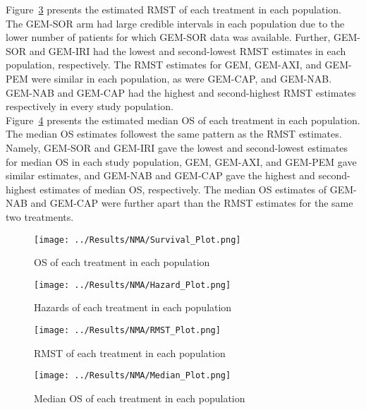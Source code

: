 Figure~\ref{fig:pred_rmstbc} presents the estimated RMST of each treatment in each population. The GEM-SOR arm had large credible intervals in each population due to the lower number of patients for which GEM-SOR data was available. Further, GEM-SOR and GEM-IRI had the lowest and second-lowest RMST estimates in each population, respectively. The RMST estimates for GEM, GEM-AXI, and GEM-PEM were similar in each population, as were GEM-CAP, and GEM-NAB. GEM-NAB and GEM-CAP had the highest and second-highest RMST estimates respectively in every study population. \\

Figure~\ref{fig:pred_medianbc} presents the estimated median OS of each treatment in each population. The median OS estimates followest the same pattern as the RMST estimates. Namely, GEM-SOR and GEM-IRI gave the lowest and second-lowest estimates for median OS in each study population, GEM, GEM-AXI, and GEM-PEM gave similar estimates, and GEM-NAB and GEM-CAP gave the highest and second-highest estimates of median OS, respectively. The median OS estimates of GEM-NAB and GEM-CAP were further apart than the RMST estimates for the same two treatments. 

\begin{figure}[h]
    \centering
    \texttt{[image: ../Results/NMA/Survival\_Plot.png]}
    \caption{OS of each treatment in each population}
    \label{fig:pred_survbc}
\end{figure}

\begin{figure}[h]
    \centering
    \texttt{[image: ../Results/NMA/Hazard\_Plot.png]}
    \caption{Hazards of each treatment in each population}
    \label{fig:pred_hazardbc}
\end{figure}

\begin{figure}[h]
    \centering
    \texttt{[image: ../Results/NMA/RMST\_Plot.png]}
    \caption{RMST of each treatment in each population}
    \label{fig:pred_rmstbc}
\end{figure}

\begin{figure}[h]
    \centering
    \texttt{[image: ../Results/NMA/Median\_Plot.png]}
    \caption{Median OS of each treatment in each population}
    \label{fig:pred_medianbc}
\end{figure}

